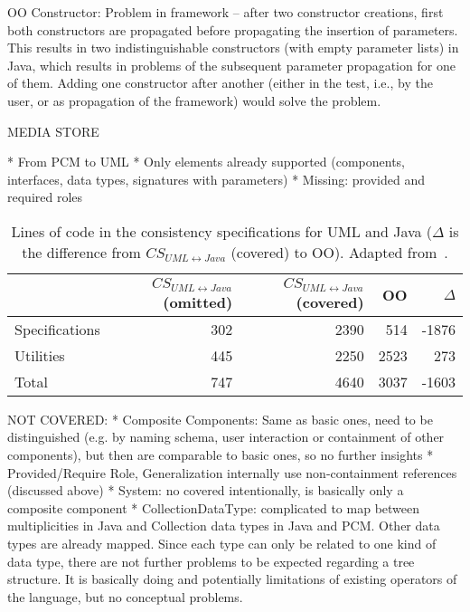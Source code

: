 OO Constructor: Problem in \vitruv framework -- after two constructor creations, first both constructors are propagated before propagating the insertion of parameters. This results in two indistinguishable constructors (with empty parameter lists) in Java, which results in problems of the subsequent parameter propagation for one of them.
Adding one constructor after another (either in the test, i.e., by the user, or as propagation of the framework) would solve the problem.


MEDIA STORE

* From PCM to UML
* Only elements already supported (components, interfaces, data types, signatures with parameters)
* Missing: provided and required roles


\begin{table}
	\small
	\centering
	\begin{tabular}{lrrrr}
		\toprule
		\multicolumn{1}{l}{\bfseries } & \multicolumn{1}{r}{$CS_{{UML}\leftrightarrow{Java}}$ (omitted)} & \multicolumn{1}{r}{$CS_{{UML}\leftrightarrow{Java}}$ (covered)} & \multicolumn{1}{r}{OO} & \multicolumn{1}{r}{$\Delta$}\\
		\midrule
		Specifications 			& 302	& 2390 	& 514 	& -1876 \\
		Utilities				& 445	& 2250	& 2523 	& 273 \\
		\midrule
		\rowcolor{\firstlinecolor}
		Total					& 747	& 4640 	& 3037 	& -1603\\
		\bottomrule
	\end{tabular}
	\caption[Lines of code in the consistency specifications for \acrshort{UML} and Java]{Lines of code in the consistency specifications for UML and Java ($\Delta$ is the difference from $CS_{{UML}\leftrightarrow{Java}}$ (covered) to OO). Adapted from~.}
	\label{tab:commonalities_evaluation:reactions_comparison}
\end{table}


NOT COVERED:
* Composite Components: Same as basic ones, need to be distinguished (e.g. by naming schema, user interaction or containment of other components), but then are comparable to basic ones, so no further insights
* Provided/Require Role, Generalization internally use non-containment references (discussed above)
* System: no covered intentionally, is basically only a composite component
* CollectionDataType: complicated to map between multiplicities in Java and Collection data types in Java and PCM. Other data types are already mapped. Since each type can only be related to one kind of data type, there are not further problems to be expected regarding a tree structure. It is basically doing and potentially limitations of existing operators of the language, but no conceptual problems.



